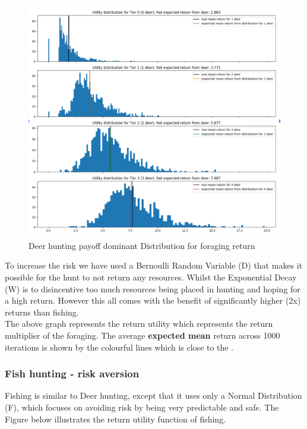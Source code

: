 \begin{figure}[!htb]
    \centering
    \includegraphics[width=1\textwidth]{04_environment/Images/Distribution of Foraging returns Deer Hunting.PNG}
    \caption{Deer hunting payoff dominant Distribution for foraging return}
    \label{Images:Distribution of Foraging returns Deer Hunting}
\end{figure}

To increase the risk we have used a Bernoulli Random Variable (D) that makes it possible for the hunt to not return any resources. Whilst the Exponential Decay (W) is to disincentive too much resources being placed in hunting and hoping for a high return. However this all comes with the benefit of significantly higher (2x) returns than fishing.\\ 

The above graph represents the return utility which represents the return multiplier of the foraging. The average \textbf{expected mean} return across 1000 iterations is shown by the colourful lines which is close to the . \\

\newpage
\subsubsection{Fish hunting - risk aversion}

Fishing is similar to Deer hunting, except that it uses only a Normal Distribution (F), which focuses on avoiding risk by being very predictable and safe. The Figure below illustrates the return utility function of fishing.\\

